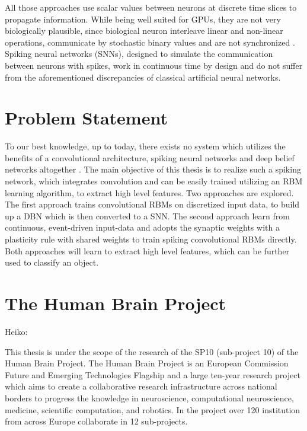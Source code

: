 All those approaches use scalar values between neurons at discrete time slices to propagate information. 
While being well suited for GPUs, they are not very biologically plausible, since biological neuron interleave linear and non-linear operations, communicate by stochastic binary values and are not synchronized \cite{bengio2015towards}. 
Spiking neural networks (SNNs), designed to simulate the communication between neurons with spikes, work in continuous time by design and do not suffer from the aforementioned discrepancies of classical artificial neural networks.

\section{Problem Statement} \label{c:probstate}

To our best knowledge, up to today, there exists no system which utilizes the benefits of a convolutional architecture, spiking neural networks and deep belief networks altogether . 
The main objective of this thesis is to realize such a spiking network, which integrates convolution and can be easily trained utilizing an RBM learning algorithm, to extract high level features. 
Two approaches are explored. 
The first approach trains convolutional RBMs on discretized input data, to build up a DBN which is then converted to a SNN. 
The second approach learn from continuous, event-driven input-data and adopts the synaptic weights with a plasticity rule with shared weights to train spiking convolutional RBMs directly. 
Both approaches will learn to extract high level features, which can be further used to classify an object. 

\section{The Human Brain Project} \label{c:thehbp}

Heiko:

This thesis is under the scope of the research of the SP10 (sub-project 10) of the Human Brain
Project. The Human Brain Project is an European Commission Future and Emerging Technologies Flagship and a large ten-year research project which aims to create a collaborative research infrastructure across national borders to progress the knowledge in neuroscience, computational neuroscience, medicine, scientific computation, and robotics. In the project over 120
institution from across Europe collaborate in 12 sub-projects.

